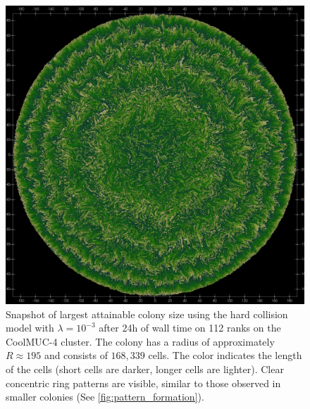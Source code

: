\documentclass[conference]{IEEEtran}
\begin{document}
\begin{figure}[H]
    \includegraphics[width=\linewidth]{figures/growth/huge.jpeg}

    \caption{Snapshot of largest attainable colony size using the hard collision model with $\lambda=10^{-3}$ after 24h of wall time on 112 ranks on the CoolMUC-4 cluster. The colony has a radius of approximately $R \approx 195$ and consists of $168{,}339$ cells. The color indicates the length of the cells (short cells are darker, longer cells are lighter). Clear concentric ring patterns are visible, similar to those observed in smaller colonies (See \autoref{fig:pattern_formation}).}
    \label{fig:huge_colony_hard}
\end{figure}




\newpage



\clearpage
\newpage
\twocolumn
\tableofcontents
\end{document}
